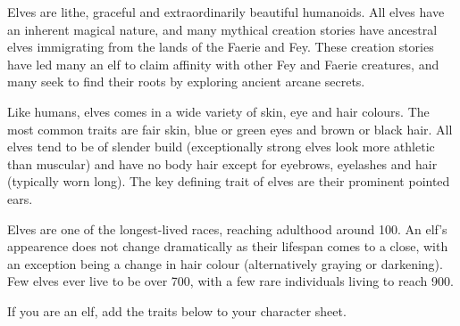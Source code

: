 \documentclass[10pt,twoside]{article}
\begin{document}
Elves are lithe, graceful and extraordinarily beautiful humanoids. All elves have an inherent magical nature, and many mythical creation stories have ancestral elves immigrating from the lands of the Faerie and Fey. These creation stories have led many an elf to claim affinity with other Fey and Faerie creatures, and many seek to find their roots by exploring ancient arcane secrets.

Like humans, elves comes in a wide variety of skin, eye and hair colours. The most common traits are fair skin, blue or green eyes and brown or black hair. All elves tend to be of slender build (exceptionally strong elves look more athletic than muscular) and have no body hair except for eyebrows, eyelashes and hair (typically worn long). The key defining trait of elves are their prominent pointed ears.

Elves are one of the longest-lived races, reaching adulthood around 100. An elf's appearence does not change dramatically as their lifespan comes to a close, with an exception being a change in hair colour (alternatively graying or darkening). Few elves ever live to be over 700, with a few rare individuals living to reach 900.

If you are an elf, add the traits below to your character sheet.
\end{document}
